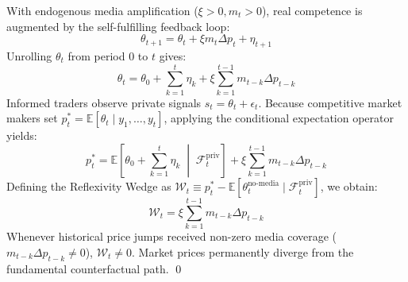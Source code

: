 \documentclass[12pt, a4paper]{article}
\begin{document}
With endogenous media amplification ($\xi > 0, m_t > 0$), real competence is augmented by the self-fulfilling feedback loop:
\begin{equation}
\theta_{t+1} = \theta_t + \xi m_t \Delta p_t + \eta_{t+1}
\end{equation}
Unrolling $\theta_t$ from period 0 to $t$ gives:
\begin{equation}
\theta_t = \theta_0 + \sum_{k=1}^t \eta_k + \xi \sum_{k=1}^{t-1} m_{t-k} \Delta p_{t-k}
\end{equation}
Informed traders observe private signals $s_t = \theta_t + \epsilon_t$. Because competitive market makers set $p_t^* = \mathbb{E}[\theta_t \mid y_1, \dots, y_t]$, applying the conditional expectation operator yields:
\begin{equation}
p_t^* = \mathbb{E}\left[ \theta_0 + \sum_{k=1}^t \eta_k \;\middle|\; \mathcal{F}_t^{\text{priv}} \right] + \xi \sum_{k=1}^{t-1} m_{t-k} \Delta p_{t-k}
\end{equation}
Defining the Reflexivity Wedge as $\mathcal{W}_t \equiv p_t^* - \mathbb{E}[\theta_t^{\text{no-media}} \mid \mathcal{F}_t^{\text{priv}}]$, we obtain:
\begin{equation}
\mathcal{W}_t = \xi \sum_{k=1}^{t-1} m_{t-k} \Delta p_{t-k}
\end{equation}
Whenever historical price jumps received non-zero media coverage ($m_{t-k} \Delta p_{t-k} \ne 0$), $\mathcal{W}_t \ne 0$. Market prices permanently diverge from the fundamental counterfactual path. \qed
\end{document}
